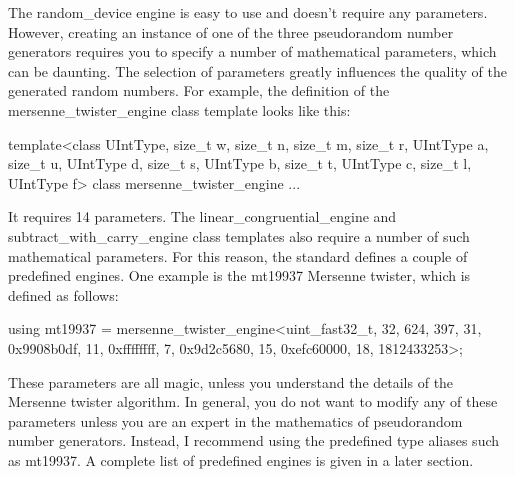 The random\_device engine is easy to use and doesn’t require any parameters. However, creating an instance of one of the three pseudorandom number generators requires you to specify a number of mathematical parameters, which can be daunting. The selection of parameters greatly influences the quality of the generated random numbers. For example, the definition of the mersenne\_twister\_engine class template looks like this:

\begin{cpp}
template<class UIntType, size_t w, size_t n, size_t m, size_t r,
                UIntType a, size_t u, UIntType d, size_t s,
                UIntType b, size_t t, UIntType c, size_t l, UIntType f>
    class mersenne_twister_engine {...}
\end{cpp}

It requires 14 parameters. The linear\_congruential\_engine and subtract\_with\_carry\_engine class templates also require a number of such mathematical parameters. For this reason, the standard defines a couple of predefined engines. One example is the mt19937 Mersenne twister, which is defined as follows:

\begin{cpp}
using mt19937 = mersenne_twister_engine<uint_fast32_t, 32, 624, 397, 31,
    0x9908b0df, 11, 0xffffffff, 7, 0x9d2c5680, 15, 0xefc60000, 18,
    1812433253>;
\end{cpp}

These parameters are all magic, unless you understand the details of the Mersenne twister algorithm. In general, you do not want to modify any of these parameters unless you are an expert in the mathematics of pseudorandom number generators. Instead, I recommend using the predefined type aliases such as mt19937. A complete list of predefined engines is given in a later section.






